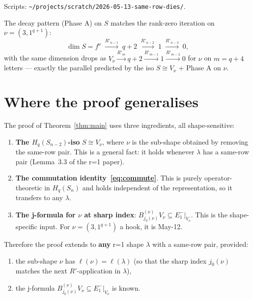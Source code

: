 \documentclass[11pt]{article}
\theoremstyle{definition}
\begin{document}
Scripts: \texttt{\textasciitilde/projects/scratch/2026-05-13-same-row-dies/}.

The decay pattern (Phase A) on $S$ matches the rank-zero iteration
on $\nu = (3, 1^{q+1})$:
\[
   \dim S = f^\nu
   \;\xrightarrow{R'_{n-1}}\; q + 2
   \;\xrightarrow{R'_{n-2}}\; 1
   \;\xrightarrow{R'_{n-3}}\; 0,
\]
with the same dimension drops as $V_\nu \xrightarrow{R'_m} q+2
\xrightarrow{R'_{m-1}} 1 \xrightarrow{R'_{m-2}} 0$ for $\nu$ on
$m = q + 4$ letters --- exactly the parallel
predicted by the iso $S \cong V_\nu$ + Phase A on $\nu$.

\section{Where the proof generalises}\label{sec:general}

The proof of Theorem~\ref{thm:main} uses three ingredients, all
shape-sensitive:

\begin{enumerate}[leftmargin=2em,topsep=0.3em,itemsep=0.2em]
\item \textbf{The $H_q(S_{n-2})$-iso} $S \cong V_\nu$, where
$\nu$ is the sub-shape obtained by removing the same-row pair. This
is a general fact: it holds whenever $\lambda$ has a same-row pair
(Lemma~3.3 of the r=1 paper).
\item \textbf{The commutation identity~\eqref{eq:commute}}. This is
purely operator-theoretic in $H_q(S_n)$ and holds independent of the
representation, so it transfers to any $\lambda$.
\item \textbf{The j-formula for $\nu$ at sharp index}:
$B^{(\nu)}_{j_0(\nu)} V_\nu \subseteq E_1^-|_{V_\nu}$. This is the
shape-specific input. For $\nu = (3, 1^{q+1})$ a hook, it is May-12.
\end{enumerate}

Therefore the proof extends to {\bf any} r=1 shape $\lambda$ with a
same-row pair, provided:

\begin{enumerate}[label=(\roman*),topsep=0.2em,itemsep=0.1em]
\item the sub-shape $\nu$ has $\ell(\nu) = \ell(\lambda)$ (so that the
sharp index $j_0(\nu)$ matches the next $R'$-application in $\lambda$),
\item the j-formula $B^{(\nu)}_{j_0(\nu)} V_\nu \subseteq E_1^-|_{V_\nu}$
is known.
\end{enumerate}
\end{document}
